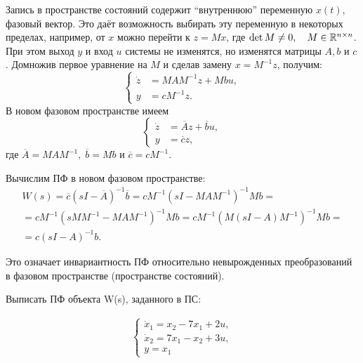\documentclass[../../TAU.tex]{subfiles}
\begin{document}
    Запись в пространстве состояний содержит ``внутреннюю'' переменную $x(t)$, фазовый вектор. Это даёт возможность выбирать эту переменную в некоторых пределах, например, от $x$ можно перейти к $z=Mx$, где 
    $\det M \neq 0,\quad M\in\mathbb{R}^{n\times n}$. 
    При этом выход $y$ и вход $u$ системы не изменятся, но изменятся матрицы $A, b$ и $c$. Домножив первое уравнение на $M$ и сделав замену 
    $x=M^{-1}z$, 
    получим:
    $$
        \left\{
        \begin{aligned}
            \dot z &=M AM^{-1}z+Mbu,\\
            y&= cM^{-1}z.
        \end{aligned}
        \right.
    $$
    В новом фазовом пространстве имеем
    $$
        \left\{
        \begin{aligned}
            \dot z &= \overline{A}z+\overline{b}u,\\
            y&= \overline{c}z,
        \end{aligned}
        \right.
    $$
    где 
    $\overline{A} = M AM^{-1},\; \overline{b} = Mb$ 
    и 
    $\overline{c}= cM^{-1}$.

    Вычислим ПФ в новом фазовом пространстве:
    \begin{multline*}
        W(s) = \overline{c}(sI-\overline{A})^{-1}\overline{b} = cM^{-1}(sI-MAM^{-1})^{-1}Mb = \\
        = c M^{-1} (sMM^{-1} - MAM^{-1})^{-1}Mb = c M^{-1}(M(sI-A)M^{-1})^{-1}Mb = \\
        =c(sI-A)^{-1}b.
    \end{multline*}

    Это означает инвариантность ПФ относительно невырожденных преобразований в фазовом пространстве (пространстве состояний).

    \examp
    {
        Выписать ПФ объекта W(s), заданного в ПС:

        \begin{align*}
            \begin{cases}
                \dot x_1=x_2-7x_1+2u, \\
                \dot x_2=7x_1-x_2+3u, \\
                y = x_1
            \end{cases}
        \end{align*}
    }
\end{document}
